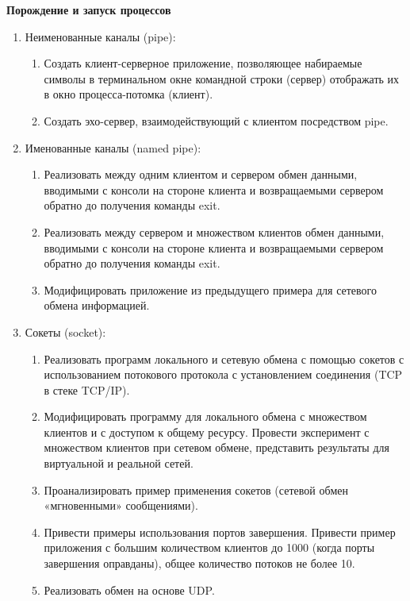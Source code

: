 \renewcommand{\labelenumii}{\theenumii}
\renewcommand{\theenumii}{\theenumi.\arabic{enumii}.}

\textbf{Порождение и запуск процессов}

\begin{enumerate}
	\item Неименованные каналы (pipe):
		\begin{enumerate}
			\item Создать клиент-серверное приложение, позволяющее набираемые символы в терминальном окне командной строки (сервер) отображать их в окно процесса-потомка (клиент).
			\item Создать эхо-сервер, взаимодействующий с клиентом посредством pipe.
		\end{enumerate}
	\item Именованные каналы (named pipe):
		\begin{enumerate}
			\item Реализовать между одним клиентом и сервером обмен данными, вводимыми с консоли на стороне клиента и возвращаемыми сервером обратно до получения команды exit.
			\item Реализовать между сервером и множеством клиентов обмен данными, вводимыми с консоли на стороне клиента и возвращаемыми сервером обратно до получения команды exit.
			\item Модифицировать приложение из предыдущего примера для сетевого обмена информацией.
		\end{enumerate}
	\item Сокеты (socket):
		\begin{enumerate}
			\item Реализовать программ локального и сетевую обмена с помощью сокетов с использованием потокового протокола с установлением соединения (TCP в стеке TCP/IP).
			\item Модифицировать программу для локального обмена с множеством клиентов и с доступом к общему ресурсу. Провести эксперимент с множеством клиентов при сетевом обмене, представить результаты для виртуальной и реальной сетей.
			\item Проанализировать пример применения сокетов (сетевой обмен «мгновенными» сообщениями).
			\item Привести примеры использования портов завершения. Привести пример приложения с большим количеством клиентов до 1000 (когда порты завершения оправданы), общее количество потоков не более 10.
			\item Реализовать обмен на основе UDP.
		\end{enumerate}

\end{enumerate}
